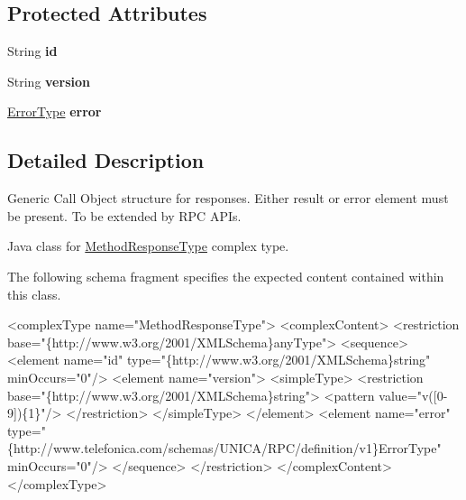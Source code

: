 \subsection*{Protected Attributes}
\begin{DoxyCompactItemize}
\item 
\hypertarget{classcom_1_1telefonica_1_1schemas_1_1unica_1_1rpc_1_1definition_1_1v1_1_1MethodResponseType_acaefe6b176554e06209b41dd3848f49c}{
String {\bfseries id}}
\label{classcom_1_1telefonica_1_1schemas_1_1unica_1_1rpc_1_1definition_1_1v1_1_1MethodResponseType_acaefe6b176554e06209b41dd3848f49c}

\item 
\hypertarget{classcom_1_1telefonica_1_1schemas_1_1unica_1_1rpc_1_1definition_1_1v1_1_1MethodResponseType_a454d61c96770dc5e8054e872806ebb25}{
String {\bfseries version}}
\label{classcom_1_1telefonica_1_1schemas_1_1unica_1_1rpc_1_1definition_1_1v1_1_1MethodResponseType_a454d61c96770dc5e8054e872806ebb25}

\item 
\hypertarget{classcom_1_1telefonica_1_1schemas_1_1unica_1_1rpc_1_1definition_1_1v1_1_1MethodResponseType_a76626625fe7b7e50de3dd0b98fada908}{
\hyperlink{classcom_1_1telefonica_1_1schemas_1_1unica_1_1rpc_1_1definition_1_1v1_1_1ErrorType}{ErrorType} {\bfseries error}}
\label{classcom_1_1telefonica_1_1schemas_1_1unica_1_1rpc_1_1definition_1_1v1_1_1MethodResponseType_a76626625fe7b7e50de3dd0b98fada908}

\end{DoxyCompactItemize}


\subsection{Detailed Description}
Generic Call Object structure for responses. Either result or error element must be present. To be extended by RPC APIs.

Java class for \hyperlink{classcom_1_1telefonica_1_1schemas_1_1unica_1_1rpc_1_1definition_1_1v1_1_1MethodResponseType}{MethodResponseType} complex type.

The following schema fragment specifies the expected content contained within this class.


\begin{DoxyPre}
 <complexType name="MethodResponseType">
   <complexContent>
     <restriction base="\{http://www.w3.org/2001/XMLSchema\}anyType">
       <sequence>
         <element name="id" type="\{http://www.w3.org/2001/XMLSchema\}string" minOccurs="0"/>
         <element name="version">
           <simpleType>
             <restriction base="\{http://www.w3.org/2001/XMLSchema\}string">
               <pattern value="v([0-9])\{1\}"/>
             </restriction>
           </simpleType>
         </element>
         <element name="error" type="\{http://www.telefonica.com/schemas/UNICA/RPC/definition/v1\}ErrorType" minOccurs="0"/>
       </sequence>
     </restriction>
   </complexContent>
 </complexType>
 \end{DoxyPre}
 

